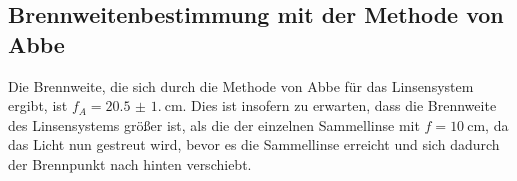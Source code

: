 \subsection{Brennweitenbestimmung mit der Methode von Abbe}
Die Brennweite, die sich durch die Methode von Abbe für das Linsensystem ergibt, ist $f_A=\qty{20.5(1.0)}{\centi\meter}$.
Dies ist insofern zu erwarten, dass die Brennweite des Linsensystems größer ist, als die der einzelnen Sammellinse mit $f=\qty{10}{\centi\meter}$,
da das Licht nun gestreut wird, bevor es die Sammellinse erreicht und sich dadurch der Brennpunkt nach hinten verschiebt.
